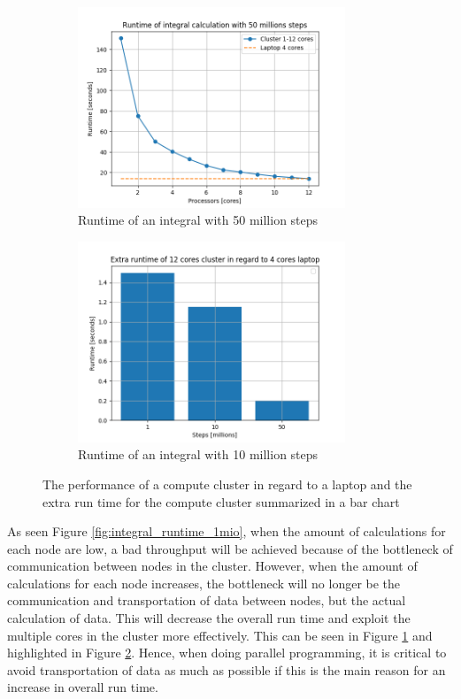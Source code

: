 \documentclass[../Head/Report.tex]{subfiles}
\begin{document}
\begin{figure}[H]
\centering
\captionsetup{justification=centering}
  \begin{subfigure}[b]{0.48\textwidth}
  \centering
    \includegraphics[height=6cm]{../Figures/integral_runtime_test_50mio.png}
    \caption{Runtime of an integral with 50 million steps}
    \label{fig:integral_runtime_50mio}
  \end{subfigure}
  \hfill
  \begin{subfigure}[b]{0.48\textwidth}
  \centering
    \includegraphics[height=6cm]{../Figures/barchart_runtime.png}
    \caption{Runtime of an integral with 10 million steps}
    \label{fig:extra_runtime_cluster}
  \end{subfigure}
  \caption{The performance of a compute cluster in regard to a laptop and the extra run time for the compute cluster summarized in a bar chart}
  \label{fig:integral_runtime_50_mio_barchart}
\end{figure}

As seen Figure \ref{fig:integral_runtime_1mio}, when the amount of calculations for each node are low, a bad throughput will be achieved because of the bottleneck of communication between nodes in the cluster. However, when the amount of calculations for each node increases, the bottleneck will no longer be the communication and transportation of data between nodes, but the actual calculation of data. This will decrease the overall run time and exploit the multiple cores in the cluster more effectively. This can be seen in Figure \ref{fig:integral_runtime_50mio} and highlighted in Figure \ref{fig:extra_runtime_cluster}. Hence, when doing parallel programming, it is critical to avoid transportation of data as much as possible if this is the main reason for an increase in overall run time. 
\end{document}
